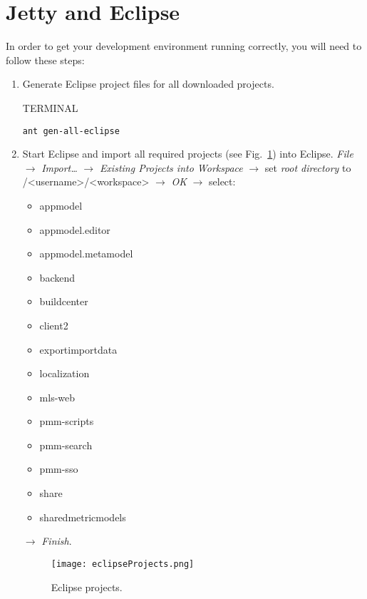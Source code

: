 \documentclass[10pt,a4paper]{article}
\begin{document}
\section{Jetty and Eclipse}
In order to get your development environment running correctly, you will need to follow these steps:
\begin{enumerate}
\item{}Generate Eclipse project files for all downloaded projects.

\begin{command}{TERMINAL}

\begin{lstlisting}
ant gen-all-eclipse
\end{lstlisting}
\end{command}

\item{}Start Eclipse and import all required projects (see Fig.~\ref{fig:projects}) into Eclipse. \textit{File} $\rightarrow$ \textit{Import\ldots} $\rightarrow$ \textit{Existing Projects into Workspace} $\rightarrow$ set \textit{root directory} to /<username>/<workspace> $\rightarrow$ \textit{OK} $\rightarrow$ select:
\begin{itemize}
\item{}appmodel
\item{}appmodel.editor
\item{}appmodel.metamodel
\item{}backend
\item{}buildcenter
\item{}client2
\item{}exportimportdata
\item{}localization
\item{}mls-web
\item{}pmm-scripts
\item{}pmm-search
\item{}pmm-sso
\item{}share
\item{}sharedmetricmodels
\end{itemize}

$\rightarrow$ \textit{Finish}.

\begin{figure}[h!tp]
\begin{center}
%
\texttt{[image: eclipseProjects.png]}
%
\end{center}
%
\caption{Eclipse projects.}
\label{fig:projects}
%
\end{figure}




\end{enumerate}
\end{document}
